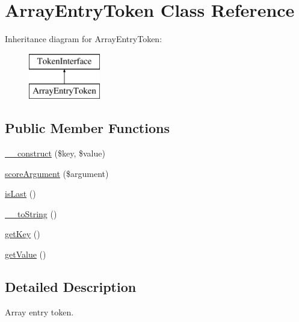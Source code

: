 \hypertarget{class_prophecy_1_1_argument_1_1_token_1_1_array_entry_token}{}\section{Array\+Entry\+Token Class Reference}
\label{class_prophecy_1_1_argument_1_1_token_1_1_array_entry_token}
Inheritance diagram for Array\+Entry\+Token\+:\begin{figure}[H]
\begin{center}
\leavevmode
\includegraphics[height=2.000000cm]{class_prophecy_1_1_argument_1_1_token_1_1_array_entry_token}
\end{center}
\end{figure}
\subsection*{Public Member Functions}
\begin{DoxyCompactItemize}
\item 
\mbox{\hyperlink{class_prophecy_1_1_argument_1_1_token_1_1_array_entry_token_a67559bb1a40b15c0c8e2c1acd2bdee2f}{\+\_\+\+\_\+construct}} (\$key, \$value)
\item 
\mbox{\hyperlink{class_prophecy_1_1_argument_1_1_token_1_1_array_entry_token_a8d5bf47ab6eaa935458d5ad160e52822}{score\+Argument}} (\$argument)
\item 
\mbox{\hyperlink{class_prophecy_1_1_argument_1_1_token_1_1_array_entry_token_ac72b8349b1340887fc1af30eca2b951c}{is\+Last}} ()
\item 
\mbox{\hyperlink{class_prophecy_1_1_argument_1_1_token_1_1_array_entry_token_a7516ca30af0db3cdbf9a7739b48ce91d}{\+\_\+\+\_\+to\+String}} ()
\item 
\mbox{\hyperlink{class_prophecy_1_1_argument_1_1_token_1_1_array_entry_token_ad40c766ec8aced9770fe6ae269a1e781}{get\+Key}} ()
\item 
\mbox{\hyperlink{class_prophecy_1_1_argument_1_1_token_1_1_array_entry_token_ac0bc18784b182c89fcfd276625aef435}{get\+Value}} ()
\end{DoxyCompactItemize}


\subsection{Detailed Description}
Array entry token.

